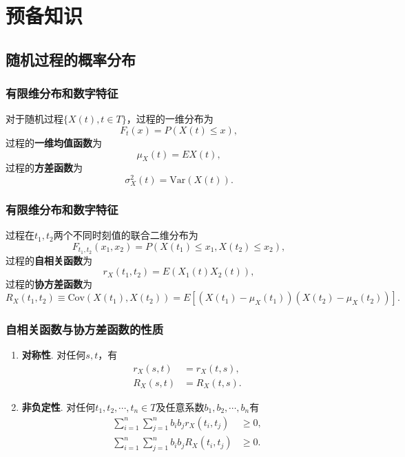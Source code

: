 \section{预备知识}

\subsection{随机过程的概率分布}

\begin{frame}
  \frametitle{有限维分布和数字特征}
  对于随机过程$\{X(t),t\in T\}$，过程的一维分布为
  $$
    F_t(x)=P(X(t)\leqslant x),
  $$
  过程的\textbf{一维均值函数}为
  $$
    \mu_X(t)=EX(t),
  $$
  过程的\textbf{方差函数}为
  $$
    \sigma_X^2(t)=\mathrm{Var}(X(t)).
  $$
\end{frame}

\begin{frame}
  \frametitle{有限维分布和数字特征}
  过程在$t_1,t_2$两个不同时刻值的联合二维分布为
  $$
  F_{t_1,t_2}(x_1,x_2)=P(X(t_1)\leqslant x_1,X(t_2)\leqslant x_2),
  $$
  过程的\textbf{自相关函数}为
  $$
  r_X(t_1,t_2)=E(X_1(t)X_2(t)),
  $$
  过程的\textbf{协方差函数}为
  $$
  R_X(t_1,t_2)\equiv\mathrm{Cov}(X(t_1),X(t_2))=E[(X(t_1)-\mu_X(t_1))(X(t_2)-\mu_X(t_2))].
  $$
\end{frame}

\begin{frame}
  \frametitle{自相关函数与协方差函数的性质}
  \begin{enumerate}
    \item \textbf{对称性}. 对任何$s,t$，有
          \begin{align*}
            r_X(s,t)&=r_X(t,s),\\
            R_X(s,t)&=R_X(t,s).
          \end{align*}

    \item \textbf{非负定性}. 对任何$t_1,t_2,\cdots,t_n\in T$及任意系数$b_1,b_2,\cdots,b_n$有
          \begin{align*}
            \sum_{i=1}^n\sum_{j=1}^nb_ib_jr_X(t_i,t_j)&\geqslant 0,\\
            \sum_{i=1}^n\sum_{j=1}^nb_ib_jR_X(t_i,t_j)&\geqslant 0.\\
          \end{align*}

  \end{enumerate}

\end{frame}

